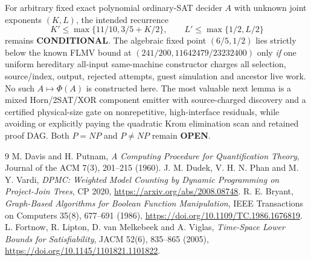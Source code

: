 \documentclass[11pt]{article}
\begin{document}
For arbitrary fixed exact polynomial ordinary-SAT decider $A$ with unknown joint exponents $(K,L)$, the intended recurrence
\[
 K'\le \max\{11/10,3/5+K/2\},\qquad
 L'\le \max\{1/2,L/2\}
\]
remains \textbf{CONDITIONAL}. The algebraic fixed point $(6/5,1/2)$ lies strictly below the known FLMV bound at $(241/200,11642479/23232400)$ only \emph{if} one uniform hereditary all-input same-machine constructor charges all selection, source/index, output, rejected attempts, guest simulation and ancestor live work. No such $A\mapsto\Phi(A)$ is constructed here. The most valuable next lemma is a mixed Horn/2SAT/XOR component emitter with source-charged discovery and a certified physical-size gate on nonrepetitive, high-interface residuals, while avoiding or explicitly paying the quadratic Krom elimination scan and retained proof DAG. Both $P=NP$ and $P\ne NP$ remain \textbf{OPEN}.

\begin{thebibliography}{9}
 M. Davis and H. Putnam, \emph{A Computing Procedure for Quantification Theory}, Journal of the ACM 7(3), 201--215 (1960).
 J. M. Dudek, V. H. N. Phan and M. Y. Vardi, \emph{DPMC: Weighted Model Counting by Dynamic Programming on Project-Join Trees}, CP 2020, \url{https://arxiv.org/abs/2008.08748}.
 R. E. Bryant, \emph{Graph-Based Algorithms for Boolean Function Manipulation}, IEEE Transactions on Computers 35(8), 677--691 (1986), \url{https://doi.org/10.1109/TC.1986.1676819}.
 L. Fortnow, R. Lipton, D. van Melkebeek and A. Viglas, \emph{Time-Space Lower Bounds for Satisfiability}, JACM 52(6), 835--865 (2005), \url{https://doi.org/10.1145/1101821.1101822}.
\end{thebibliography}
\end{document}
